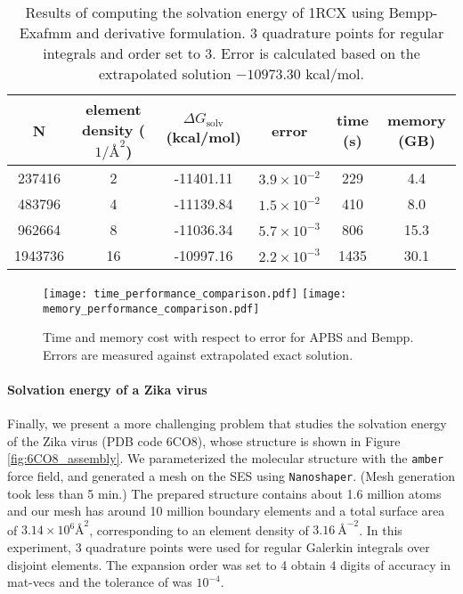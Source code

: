 \begin{table*}[]
    \centering
    \begin{tabular}{cc|cc|cc}
    N       & element density ($1/ \si{\angstrom}^2$) & $\Delta G_{\mathrm{solv}}$ (kcal/mol) & error               & time (s) & memory (GB) \\ \hline
    237416  & 2                                       & -11401.11                             & $3.9\times 10^{-2}$ & 229      & 4.4         \\
    483796  & 4                                       & -11139.84                             & $1.5\times 10^{-2}$ & 410      & 8.0         \\
    962664  & 8                                       & -11036.34                             & $5.7\times 10^{-3}$ & 806      & 15.3        \\
    1943736 & 16                                      & -10997.16                             & $2.2\times 10^{-3}$ & 1435     & 30.1       
    \end{tabular}
    \caption{Results of computing the solvation energy of 1RCX using Bempp-Exafmm and derivative formulation.
    3 quadrature points for regular integrals and \fmm order set to 3.
    Error is calculated based on the extrapolated solution $-10973.30$ kcal/mol.}
    \label{tab:1RCX_bempp}
\end{table*}

\begin{figure*}
    \begin{center}
        \texttt{[image: time\_performance\_comparison.pdf]}
        \label{fig:time_performance_comparsion}\qquad
        \texttt{[image: memory\_performance\_comparison.pdf]}
        \label{fig:memory_performance_comparison}
    \end{center}
    \caption{Time and memory cost with respect to error for APBS and Bempp.
    Errors are measured against extrapolated exact solution.
    }
    \label{fig:performance_comparison_apbs}
\end{figure*}

\paragraph{Solvation energy of a Zika virus} \label{result_zika}

Finally, we present a more challenging problem that studies the solvation energy of the Zika virus (PDB code 6CO8), whose structure \cite{sevvana2018refinement} is shown in Figure \ref{fig:6CO8_assembly}.
We parameterized the molecular structure with the \texttt{amber} \cite{caseAmberBiomolecularSimulation2005} force field, and generated a mesh on the SES using \texttt{Nanoshaper}. (Mesh generation took less than 5 min.)
The prepared structure contains about 1.6 million atoms and our mesh has around 10 million boundary elements and a total surface area of $3.14\times 10^6 {\si{\angstrom}}^{2}$, corresponding to an element density of $\SI{3.16}{\angstrom}^{-2}$.
In this experiment, 3 quadrature points were used for regular Galerkin integrals over disjoint elements.
The \fmm expansion order was set to 4 obtain 4 digits of accuracy in mat-vecs and the tolerance of \gmres was $10^{-4}$.

